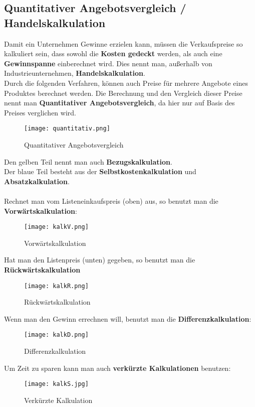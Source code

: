 \documentclass[asp1.tex]{subfiles}
\begin{document}
\subsection{Quantitativer Angebotsvergleich / Handelskalkulation}
\label{sec:Handelskalkulation}
Damit ein Unternehmen Gewinne erzielen kann, müssen die Verkaufspreise so kalkuliert sein, dass sowohl die \textbf{Kosten gedeckt} werden, als auch eine \textbf{Gewinnspanne} einberechnet wird. Dies nennt man, außerhalb von Industrieunternehmen, \textbf{Handelskalkulation}. \\
Durch die folgenden Verfahren, können auch Preise für mehrere Angebote eines Produktes berechnet werden. Die Berechnung und den Vergleich dieser Preise nennt man \textbf{Quantitativer Angebotsvergleich}, da hier nur auf Basis des Preises verglichen wird.
\begin{figure}[H]
    \begin{center}
        \texttt{[image: quantitativ.png]}
    \end{center}
    \caption{Quantitativer Angebotsvergleich}
    \label{fig:Quantitativer Angebotsvergleich}
\end{figure}
Den gelben Teil nennt man auch \textbf{Bezugskalkulation}. \\
Der blaue Teil besteht aus der \textbf{Selbstkostenkalkulation} und \textbf{Absatzkalkulation}. \\ \\
Rechnet man vom Listeneinkaufspreis (oben) aus, so benutzt man die \textbf{Vorw\"artskalkulation}:
\begin{figure}[H]
    \begin{center}
        \texttt{[image: kalkV.png]}
    \end{center}
    \caption{Vorwärtskalkulation}
    \label{fig:Vorwärtskalkulation}
\end{figure}
Hat man den Listenpreis (unten) gegeben, so benutzt man die \textbf{R\"uckw\"artskalkulation}
\begin{figure}[H]
    \begin{center}
        \texttt{[image: kalkR.png]}
    \end{center}
    \caption{Rückwärtskalkulation}
    \label{fig:Rückwärtskalkulation}
\end{figure}
Wenn man den Gewinn errechnen will, benutzt man die \textbf{Differenzkalkulation}:
\begin{figure}[H]
    \begin{center}
        \texttt{[image: kalkD.png]}
    \end{center}
    \caption{Differenzkalkulation}
    \label{fig:Differenzkalkulation}
\end{figure}
Um Zeit zu sparen kann man auch \textbf{verk\"urzte Kalkulationen} benutzen:
\begin{figure}[H]
    \begin{center}
        \texttt{[image: kalkS.jpg]}
    \end{center}
    \caption{Verkürzte Kalkulation}
    \label{fig:Verkürzte Kalkulation}
\end{figure}
\end{document}
